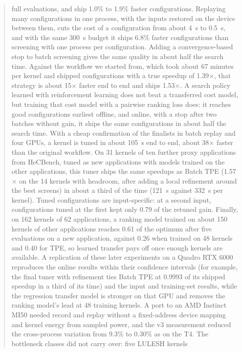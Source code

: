 \documentclass[10pt]{article}
\newcommand{\x}{\ensuremath{\times}}
\begin{document}
\begin{abstract}
full evaluations, and ship 1.0\% to 1.9\% faster configurations. Replaying many
configurations in one process, with the inputs restored on the device between
them, cuts the cost of a configuration from about 4~s to 0.5~s, and with the
same 300~s budget it ships 6.8\% faster configurations than screening with
one process per configuration. Adding a convergence-based stop to batch
screening gives the same quality in about half the search time. Against the workflow we started from, which took about 67
minutes per kernel and shipped configurations with a true speedup of
1.39\x{}, that strategy is about 15\x{} faster end to end and ships
1.53\x{}. A search policy learned with reinforcement learning does not beat a
transferred cost model, but training that cost model with a pairwise ranking
loss does: it reaches good configurations earliest offline, and online, with
a stop after two batches without gain, it ships the same configurations in
about half the search time. With a cheap confirmation of the finalists in
batch replay and four GPUs, a kernel is tuned in about 105~s end to end,
about 38\x{} faster than the original workflow. On 31 kernels of ten further
proxy applications from HeCBench, tuned as new applications with models
trained on the other applications, this tuner ships the same speedups as
Batch TPE (1.57\x{} on the 14 kernels with headroom, after adding a local
refinement around the best screens) in about a third of the time (121~s against
332~s per kernel). Tuned configurations are input-specific: at a second input,
configurations tuned at the first kept only 0.79 of the retuned gain. Finally,
on 162 kernels of 62 applications, a ranking model trained on about 150
kernels of other applications reaches 0.61 of the optimum after five
evaluations on a new application, against 0.26 when trained on 48 kernels and
0.40 for TPE, so learned transfer pays off once enough kernels are available.
A replication of these later experiments on a Quadro RTX 6000 reproduces the
online results within their confidence intervals (for example, the final tuner
with refinement ties Batch TPE at 0.9993 of its shipped speedup in a third of
its time) and the input and training-set results, while the regression transfer
model is stronger on that GPU and removes the ranking model's lead at 48
training kernels. A port to an AMD Instinct MI50 needed record and replay
without a fixed-address device mapping and kernel energy from sampled power,
and the v3 measurement reduced the cross-process variation from 9.3\% to 0.30\%
as on the T4. The bottleneck classes did not carry over: five LULESH kernels

\end{abstract}
\end{document}
